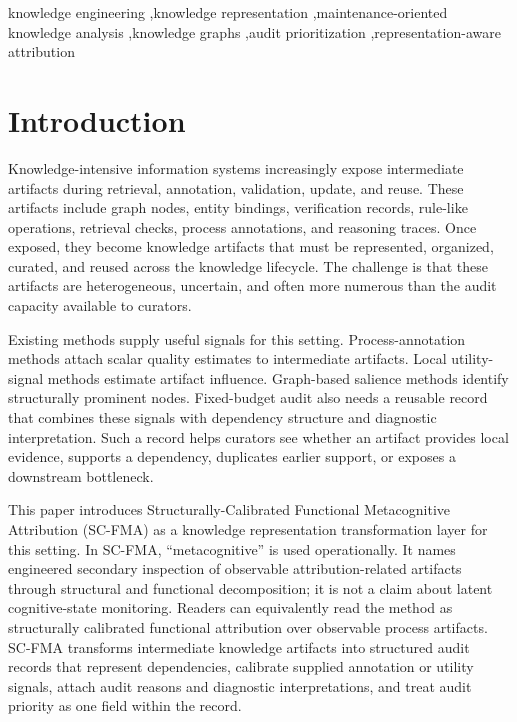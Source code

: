 \documentclass[a4paper,fleqn]{cas-sc}
\begin{document}
\begin{keywords}
knowledge engineering \sep knowledge representation \sep maintenance-oriented knowledge analysis \sep knowledge graphs \sep audit prioritization \sep representation-aware attribution
\end{keywords}

\maketitle

\section{Introduction}

Knowledge-intensive information systems increasingly expose intermediate artifacts during retrieval, annotation, validation, update, and reuse. These artifacts include graph nodes, entity bindings, verification records, rule-like operations, retrieval checks, process annotations, and reasoning traces. Once exposed, they become knowledge artifacts that must be represented, organized, curated, and reused across the knowledge lifecycle. The challenge is that these artifacts are heterogeneous, uncertain, and often more numerous than the audit capacity available to curators.

Existing methods supply useful signals for this setting. Process-annotation methods attach scalar quality estimates to intermediate artifacts. Local utility-signal methods estimate artifact influence. Graph-based salience methods identify structurally prominent nodes. Fixed-budget audit also needs a reusable record that combines these signals with dependency structure and diagnostic interpretation. Such a record helps curators see whether an artifact provides local evidence, supports a dependency, duplicates earlier support, or exposes a downstream bottleneck.

This paper introduces Structurally-Calibrated Functional Metacognitive Attribution (SC-FMA) as a knowledge representation transformation layer for this setting. In SC-FMA, ``metacognitive'' is used operationally. It names engineered secondary inspection of observable attribution-related artifacts through structural and functional decomposition; it is not a claim about latent cognitive-state monitoring. Readers can equivalently read the method as structurally calibrated functional attribution over observable process artifacts. SC-FMA transforms intermediate knowledge artifacts into structured audit records that represent dependencies, calibrate supplied annotation or utility signals, attach audit reasons and diagnostic interpretations, and treat audit priority as one field within the record.
\end{document}

